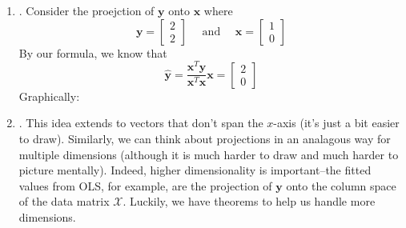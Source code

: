 \documentclass[12pt]{article}
\begin{document}
\begin{enumerate}
\begin{enumerate}
\begin{align*}
		\hat{\mathbf{u}} & =\begin{bmatrix} -1 \\2 \end{bmatrix}
		&\text{(simplifying)}
		\shortintertext{Thus, the vector $\mathbf{y}$ can be written as}\\[-12pt]
		\mathbf{y}& = \begin{bmatrix} 8 \\ 4 \end{bmatrix} + \begin{bmatrix} -1 \\2 \end{bmatrix}
		\end{align*}

		\item\underline{}.
		Consider the proejction of $\mathbf{y}$ onto $\mathbf{x}$ where
		\[\mathbf{y}=\begin{bmatrix}2\\2\end{bmatrix}\quad\text{ and }\quad\mathbf{x}=\begin{bmatrix}1\\0\end{bmatrix}\]
		By our formula, we know that 
		\[\hat{\mathbf{y}}=\frac{\mathbf{x}^T\mathbf{y}}{\mathbf{x}^T\mathbf{x}}\mathbf{x}=\begin{bmatrix}2\\0\end{bmatrix}\]
		Graphically:
		\begin{center}
		\end{center}
		
		\item\underline{}.
		This idea extends to vectors that don't span the $x$-axis (it's just a bit easier to draw). Similarly, we can think
		about projections in an analagous way for multiple dimensions (although it is much harder to draw and much harder to
		picture mentally). Indeed, higher dimensionality is important--the fitted values from OLS, for example, are the projection
		of $\mathbf{y}$ onto the column space of the data matrix $\mathcal{X}$. Luckily, we have theorems to help us handle more dimensions.
		

\end{enumerate}
\end{enumerate}
\end{document}
